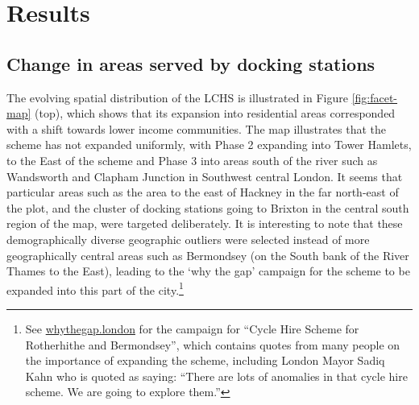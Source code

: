 \documentclass[]{article}
\begin{document}
\hypertarget{results}{%
\section{Results}\label{results}}

\hypertarget{change-in-areas-served-by-docking-stations}{%
\subsection{Change in areas served by docking stations}\label{change-in-areas-served-by-docking-stations}}

The evolving spatial distribution of the LCHS is illustrated in Figure \ref{fig:facet-map} (top), which shows that its expansion into residential areas corresponded with a shift towards lower income communities.
The map illustrates that the scheme has not expanded uniformly, with Phase 2 expanding into Tower Hamlets, to the East of the scheme and Phase 3 into areas south of the river such as Wandsworth and Clapham Junction in Southwest central London.
It seems that particular areas such as the area to the east of Hackney in the far north-east of the plot, and the cluster of docking stations going to Brixton in the central south region of the map, were targeted deliberately.
It is interesting to note that these demographically diverse geographic outliers were selected instead of more geographically central areas such as Bermondsey (on the South bank of the River Thames to the East), leading to the `why the gap' campaign for the scheme to be expanded into this part of the city.\footnote{See \href{http://whythegap.london}{whythegap.london} for the campaign for ``Cycle Hire Scheme for Rotherhithe and Bermondsey'', which contains quotes from many people on the importance of expanding the scheme, including London Mayor Sadiq Kahn who is quoted as saying:
  ``There are lots of anomalies in that cycle hire scheme. We are going to explore them.''}
\end{document}
